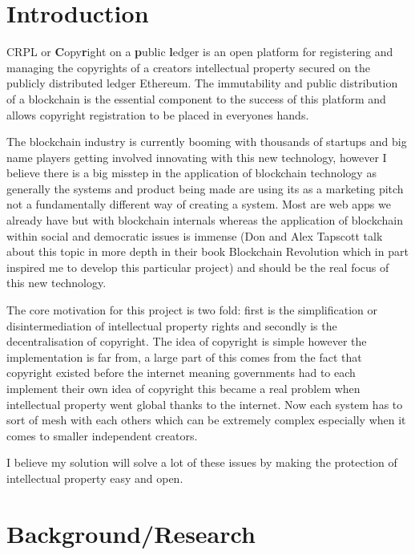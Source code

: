 \documentclass[12pt]{report}
\begin{document}
\chapter{Introduction}

CRPL or \textbf{C}opy\textbf{r}ight on a \textbf{p}ublic \textbf{l}edger is an open platform for registering and managing the copyrights of a creators intellectual property secured on the publicly distributed ledger Ethereum. The immutability and public distribution of a blockchain is the essential component to the success of this platform and allows copyright registration to be placed in everyones hands.

The blockchain industry is currently booming with thousands of startups and big name players getting involved innovating with this new technology, however I believe there is a big misstep in the application of blockchain technology as generally the systems and product being made are using its as a marketing pitch not a fundamentally different way of creating a system. Most are web apps we already have but with blockchain internals whereas the application of blockchain within social and democratic issues is immense (Don and Alex Tapscott talk about this topic in more depth in their book Blockchain Revolution\cite{blockchain_revolution} which in part inspired me to develop this particular project) and should be the real focus of this new technology.

The core motivation for this project is two fold: first is the simplification or disintermediation of intellectual property rights and secondly is the decentralisation of copyright. The idea of copyright is simple however the implementation is far from, a large part of this comes from the fact that copyright existed before the internet meaning governments had to each implement their own idea of copyright this became a real problem when intellectual property went global thanks to the internet. Now each system has to sort of mesh with each others which can be extremely complex especially when it comes to smaller independent creators.

I believe my solution will solve a lot of these issues by making the protection of intellectual property easy and open.

\chapter{Background/Research}
\end{document}
